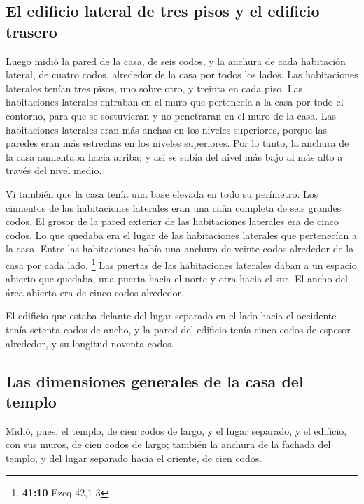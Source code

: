 \hypertarget{el-edificio-lateral-de-tres-pisos-y-el-edificio-trasero}{%
\subsection{El edificio lateral de tres pisos y el edificio
trasero}\label{el-edificio-lateral-de-tres-pisos-y-el-edificio-trasero}}

 Luego midió la pared de la casa, de seis codos, y la
anchura de cada habitación lateral, de cuatro codos, alrededor de la
casa por todos los lados.  Las habitaciones laterales
tenían tres pisos, uno sobre otro, y treinta en cada piso. Las
habitaciones laterales entraban en el muro que pertenecía a la casa por
todo el contorno, para que se sostuvieran y no penetraran en el muro de
la casa.  Las habitaciones laterales eran más anchas en
los niveles superiores, porque las paredes eran más estrechas en los
niveles superiores. Por lo tanto, la anchura de la casa aumentaba hacia
arriba; y así se subía del nivel más bajo al más alto a través del nivel
medio.

 Vi también que la casa tenía una base elevada en todo su
perímetro. Los cimientos de las habitaciones laterales eran una caña
completa de seis grandes codos.  El grosor de la pared
exterior de las habitaciones laterales era de cinco codos. Lo que
quedaba era el lugar de las habitaciones laterales que pertenecían a la
casa.  Entre las habitaciones había una anchura de veinte
codos alrededor de la casa por cada lado. \footnote{\textbf{41:10} Ezeq
  42,1-3}  Las puertas de las habitaciones laterales
daban a un espacio abierto que quedaba, una puerta hacia el norte y otra
hacia el sur. El ancho del área abierta era de cinco codos alrededor.

 El edificio que estaba delante del lugar separado en el
lado hacia el occidente tenía setenta codos de ancho, y la pared del
edificio tenía cinco codos de espesor alrededor, y su longitud noventa
codos.

\hypertarget{las-dimensiones-generales-de-la-casa-del-templo}{%
\subsection{Las dimensiones generales de la casa del
templo}\label{las-dimensiones-generales-de-la-casa-del-templo}}

 Midió, pues, el templo, de cien codos de largo, y el
lugar separado, y el edificio, con sus muros, de cien codos de largo;
 también la anchura de la fachada del templo, y del lugar
separado hacia el oriente, de cien codos.

